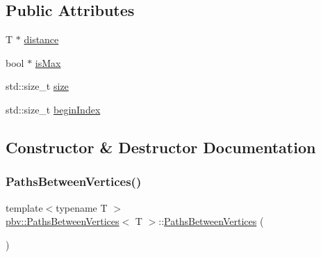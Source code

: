 \subsection*{Public Attributes}
\begin{DoxyCompactItemize}
\item 
T $\ast$ \mbox{\hyperlink{structpbv_1_1_paths_between_vertices_a67aed042aa649d2b6dfeee29d3ec6416}{distance}}
\item 
bool $\ast$ \mbox{\hyperlink{structpbv_1_1_paths_between_vertices_a8d7391a03771f17ca699f519e64bf2a4}{is\+Max}}
\item 
std\+::size\+\_\+t \mbox{\hyperlink{structpbv_1_1_paths_between_vertices_a7ffee986b1b7f57a881a883b58bc67f4}{size}}
\item 
std\+::size\+\_\+t \mbox{\hyperlink{structpbv_1_1_paths_between_vertices_abf43c3771ed161bb80a73fe39e5cc916}{begin\+Index}}
\end{DoxyCompactItemize}


\subsection{Constructor \& Destructor Documentation}
\mbox{\label{structpbv_1_1_paths_between_vertices_ab9812924cc3075c7501dd17d5a4f4d9c}} 
\subsubsection{\texorpdfstring{Paths\+Between\+Vertices()}{PathsBetweenVertices()}\hspace{0.1cm}{\footnotesize\ttfamily [1/4]}}
{\footnotesize\ttfamily template$<$typename T $>$ \\
\mbox{\hyperlink{structpbv_1_1_paths_between_vertices}{pbv\+::\+Paths\+Between\+Vertices}}$<$ T $>$\+::\mbox{\hyperlink{structpbv_1_1_paths_between_vertices}{Paths\+Between\+Vertices}} (\begin{DoxyParamCaption}{ }\end{DoxyParamCaption})}

\mbox{\label{structpbv_1_1_paths_between_vertices_a352d3e86d9e9776ad7c9ec69844d5651}} 
